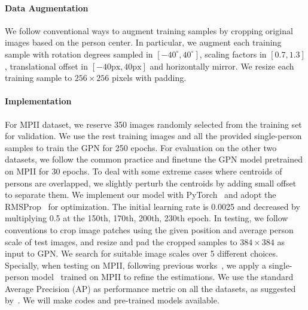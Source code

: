 \documentclass[10pt,twocolumn,letterpaper]{article}
\begin{document}
\vspace{-4mm}
\paragraph{Data Augmentation} We follow  conventional ways to augment training samples by cropping original images based on the  person center. In particular, we augment each training sample with rotation degrees sampled in $[-40^{\circ}, 40^{\circ}]$, scaling  factors in $[0.7, 1.3]$, translational offset in $[-40\text{px}, 40\text{px}]$ and horizontally mirror. We resize each training sample to  $256 {\times} 256$ pixels with padding.

\vspace{-4mm}
\paragraph{Implementation} For  MPII dataset, we reserve 350 images randomly selected from the training set for validation. We use the rest training images and all the provided single-person  samples to train the GPN for 250 epochs. For evaluation on the other two datasets, we  follow the common practice and finetune the GPN model pretrained on MPII for 30 epochs. To deal with some extreme cases where centroids of persons are overlapped, we slightly perturb the centroids by adding small offset to separate them. We implement our model with PyTorch~\cite{paszke2017pytorch} and adopt the RMSProp~\cite{rmsprop2012} for optimization. The initial learning rate is 0.0025 and decreased by multiplying 0.5 at the 150th, 170th, 200th, 230th epoch. In testing, we follow conventions to crop image patches using the given position and  average person scale of test images, and resize and pad the cropped samples to $384{\times}384$ as input to GPN. We search for suitable image scales  over 5 different choices. Specially, when testing on  MPII, following previous works~\cite{cao2017realtime,newell2016associative}, we apply a single-person model~\cite{hpe:hourglass_arxiv15} trained on  MPII  to  refine the estimations. We use the standard Average Precision (AP) as performance metric on all the  datasets, as suggested by~\cite{hpe:deepercut_eccv16,xia2017joint}.  We will make
codes and pre-trained models available.
\end{document}
